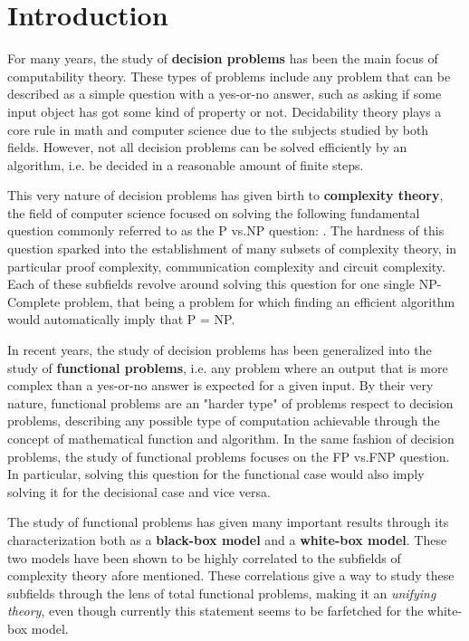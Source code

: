 \hypersetup{colorlinks=true, linkcolor=blue, citecolor=red}

\chapter{Introduction} \label{chap:introduction}

For many years, the study of \textbf{decision problems} has been the main focus of computability theory. These types of problems include any problem that can be described as a simple question with a yes-or-no answer, such as asking if some input object has got some kind of property or not. Decidability theory plays a core rule in math and computer science due to the subjects studied by both fields. However, not all decision problems can be solved efficiently by an algorithm, i.e. be decided in a reasonable amount of finite steps.

This very nature of decision problems has given birth to \textbf{complexity theory}, the field of computer science focused on solving the following fundamental question commonly referred to as the \textsf{P} vs.\@ \textsf{NP} question: . The hardness of this question sparked into the establishment of many subsets of complexity theory, in particular proof complexity, communication complexity and circuit complexity. Each of these subfields revolve around solving this question for one single \textsf{NP}-Complete problem, that being a problem for which finding an efficient algorithm would automatically imply that \textsf{P} = \textsf{NP}.

In recent years, the study of decision problems has been generalized into the study of \textbf{functional problems}, i.e. any problem where an output that is more complex than a yes-or-no answer is expected for a given input. By their very nature, functional problems are an "harder type" of problems respect to decision problems, describing any possible type of computation achievable through the concept of mathematical function and algorithm. In the same fashion of decision problems, the study of functional problems focuses on the \textsf{FP} vs.\@ \textsf{FNP} question. In particular, solving this question for the functional case would also imply solving it for the decisional case and vice versa.

The study of functional problems has given many important results through its characterization both as a \textbf{black-box model} and a \textbf{white-box model}. These two models have been shown to be highly correlated to the subfields of complexity theory afore mentioned. These correlations give a way to study these subfields through the lens of total functional problems, making it an \textit{unifying theory}, even though currently this statement seems to be farfetched for the white-box model.


\cleardoublepage